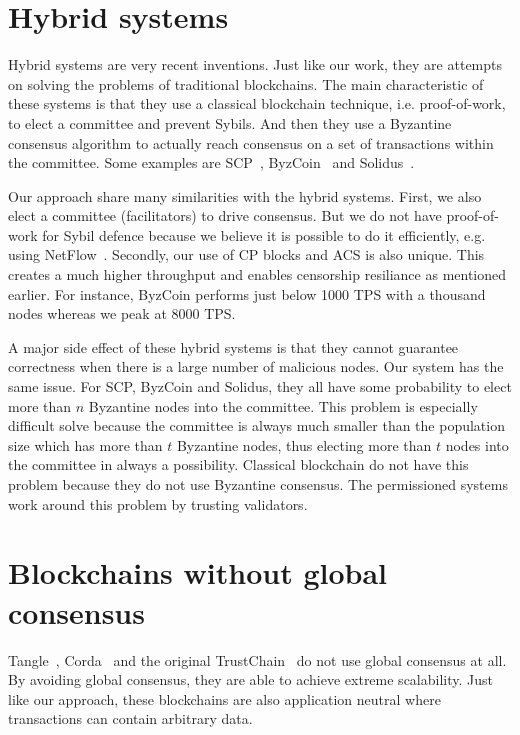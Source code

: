 \section{Hybrid systems}
Hybrid systems are very recent inventions.
Just like our work, they are attempts on solving the problems of traditional blockchains.
The main characteristic of these systems is that they use a classical blockchain technique,
i.e. proof-of-work, to elect a committee and prevent Sybils.
And then they use a Byzantine consensus algorithm to actually reach consensus on a set of transactions within the committee.
Some examples are SCP~\cite{luu2015scp}, ByzCoin~\cite{kogias2016enhancing} and Solidus~\cite{abraham2016solidus}.

Our approach share many similarities with the hybrid systems.
First, we also elect a committee (facilitators) to drive consensus.
But we do not have proof-of-work for Sybil defence because we believe 
it is possible to do it efficiently, e.g. using NetFlow~\cite{pimotte}.
Secondly, our use of CP blocks and ACS is also unique.
This creates a much higher throughput and enables censorship resiliance as mentioned earlier.
For instance, ByzCoin performs just below 1000 TPS with a thousand nodes whereas we peak at 8000 TPS.

A major side effect of these hybrid systems is that they cannot guarantee correctness when there is a large number of malicious nodes.
Our system has the same issue.
For SCP, ByzCoin and Solidus, they all have some probability to elect more than $n$ Byzantine nodes into the committee.
This problem is especially difficult solve because the committee is always much smaller than the population size which has more than $t$ Byzantine nodes,
thus electing more than $t$ nodes into the committee in always a possibility.
Classical blockchain do not have this problem because they do not use Byzantine consensus.
The permissioned systems work around this problem by trusting validators.

\section{Blockchains without global consensus}

Tangle~\cite{tangle}, Corda~\cite{corda} and the original TrustChain~\cite{trustchain} do not use global consensus at all.
By avoiding global consensus, they are able to achieve extreme scalability.
Just like our approach, these blockchains are also application neutral where transactions can contain arbitrary data.

